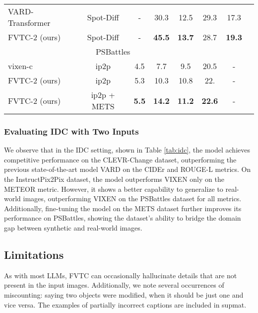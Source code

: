 \documentclass[10pt,twocolumn,letterpaper]{article}
\begin{document}
\begin{table}[ht]
\begin{center}
\begin{small}
\begin{sc}
\begin{tabular}{lccccccr}
         VARD-Transformer \cite{VARD} & Spot-Diff & - & 30.3 & 12.5 & 29.3 & 17.3\\
         FVTC-2 (ours) & Spot-Diff & - & \bf 45.5 & \bf 13.7 & 28.7 & \bf 19.3\\
         \midrule
         \multicolumn{6}{c}{PSBattles}\\
         \midrule
         vixen-c \cite{vixen}& ip2p& 4.5& 7.7& 9.5&20.5& -\\
         FVTC-2 (ours)& ip2p& 5.3& 10.3& 10.8&22.& -\\
         FVTC-2 (ours)& ip2p + METS & \bf 5.5& \bf 14.2& \bf 11.2& \bf 22.6& -\\
         \bottomrule

    \end{tabular}
\end{sc}
\end{small}
\end{center}
\vskip -0.1in
\end{table}


\subsubsection{Evaluating IDC with Two Inputs}


We observe that in the IDC setting, shown in Table \ref{tab:idc}, the model achieves competitive performance on the CLEVR-Change dataset,
outperforming the previous state-of-the-art model VARD on the CIDEr and ROUGE-L metrics.
On the InstructPix2Pix dataset, the model outperforms VIXEN only on the METEOR metric.
However, it shows a better capability to generalize to real-world images, outperforming
VIXEN on the PSBattles dataset for all metrics. Additionally, fine-tuning the model
on the METS dataset further improves its performance on PSBattles, showing the dataset's
ability to bridge the domain gap between synthetic and real-world images.


\subsection{Limitations}

As with most LLMs, FVTC can occasionally hallucinate details that are not
present in the input images. Additionally, we note several occurrences of miscounting: saying two objects were modified, when it should be just one and vice versa. The examples of partially incorrect captions are included in supmat.
\end{document}
